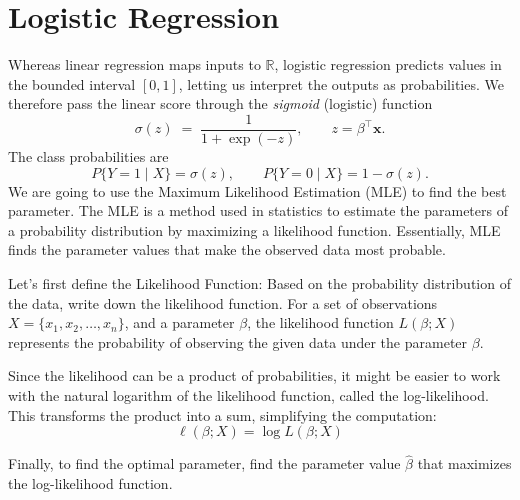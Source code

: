 \section{Logistic Regression}
\label{sec:logistic_regression}


Whereas linear regression maps inputs to $\mathbb{R}$, logistic regression
predicts values in the bounded interval $[0,1]$, letting us interpret the
outputs as probabilities.
We therefore pass the linear score through the \emph{sigmoid} (logistic)
function
\[
  \sigma(z) \;=\; \frac{1}{1+\exp(-z)}, 
  \qquad 
  z = \beta^{\!\top}\mathbf x .
\]
The class probabilities are
\[
  P\!\{Y=1\!\mid\!X\} = \sigma(z),
  \qquad
  P\!\{Y=0\!\mid\!X\} = 1 - \sigma(z).
\]
We are going to use the Maximum Likelihood Estimation (MLE) to find the best parameter. The MLE is a method used in statistics to estimate the parameters of a probability distribution by maximizing a likelihood function. Essentially, MLE finds the parameter values that make the observed data most probable.

Let's first define the Likelihood Function: Based on the probability distribution of the data, write down the likelihood function. For a set of observations \(X = \{x_1, x_2, \ldots, x_n\}\), and a parameter \(\beta\), the likelihood function \(L(\beta; X)\) represents the probability of observing the given data under the parameter \(\beta\).

Since the likelihood can be a product of probabilities, it might be easier to work with the natural logarithm of the likelihood function, called the log-likelihood. This transforms the product into a sum, simplifying the computation:
\[
\ell(\beta; X) = \log L(\beta; X)
\]

Finally, to find the optimal parameter, find the parameter value \(\hat{\beta}\) that maximizes the log-likelihood function.

